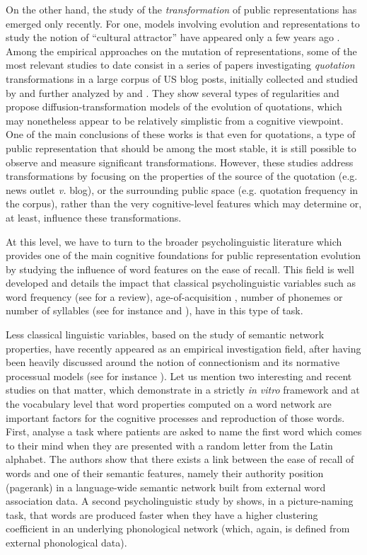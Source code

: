 On the other hand, the study of the \emph{transformation} of public representations has emerged only recently.
For one, models involving evolution and representations to study the notion of ``cultural attractor'' have appeared only a few years ago \citep{Claidiere07}.
Among the empirical approaches on the mutation of representations, some of the most relevant studies to date consist in a series of papers investigating \emph{quotation} transformations in a large corpus of US blog posts, initially collected and studied by \citet{Leskovec09} and further analyzed by \citet{Simmons11} and \citet{omod-mult}.
They show several types of regularities and propose diffusion-transformation models of the evolution of quotations, which may nonetheless appear to be relatively simplistic from a cognitive viewpoint.
One of the main conclusions of these works is that even for quotations, a type of public representation that should be among the most stable, it is still possible to observe and measure significant transformations.
However, these studies address transformations by focusing on the properties of the source of the quotation (e.g. news outlet \emph{v.} blog), or the surrounding public space (e.g. quotation frequency in the corpus), rather than the very cognitive-level features which may determine or, at least, influence these transformations.

At this level, we have to turn to the broader psycholinguistic literature which provides one of the main cognitive foundations for public representation evolution by studying the influence of word features on the ease of recall.
This field is well developed and details the impact that classical psycholinguistic variables such as word frequency (see \citet{Yonelinas02} for a review), age-of-acquisition \citep{Zevin02}, number of phonemes or number of syllables (see for instance \citet{Rey98} and \citet{nick-diss}), have in this type of task.

Less classical linguistic variables, based on the study of semantic network properties, have recently appeared as an empirical investigation field, after having been heavily discussed around the notion of connectionism and its normative processual models (see for instance \citet{collins1975spreading}).
Let us mention two interesting and recent studies on that matter, which demonstrate in a strictly \emph{in vitro} framework and at the vocabulary level that word properties computed on a word network are important factors for the cognitive processes and reproduction of those words.
First, \citet{Griffiths07} analyse a task where patients are asked to name the first word which comes to their mind when they are presented with a random letter from the Latin alphabet.
The authors show that there exists a link between the ease of recall of words and one of their semantic features, namely their authority position (pagerank) in a language-wide semantic network built from external word association data.
A second psycholinguistic study by \citet{Chan10} shows, in a picture-naming task, that words are produced faster when they have a higher clustering coefficient in an underlying phonological network (which, again, is  defined from external phonological data).

